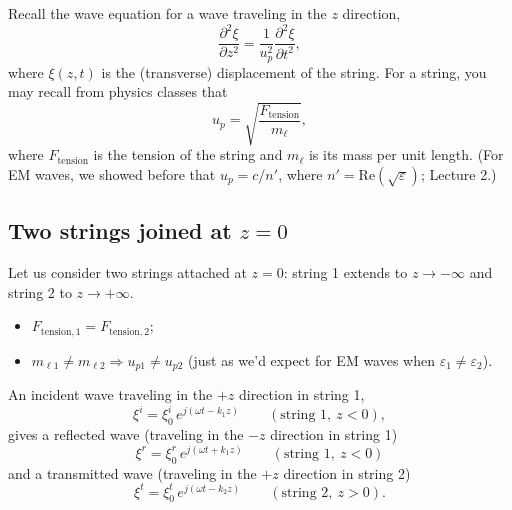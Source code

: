 \documentclass[11pt, oneside]{article}
\begin{document}
Recall the wave equation for a wave traveling in the $z$ direction,
\begin{equation}
	\frac{\partial^2 \xi}{\partial z^2} = \frac{1}{u_p^2}\frac{\partial^2 \xi}{\partial t^2},
\end{equation}
where $\xi(z,t)$ is the (transverse) displacement of the string. For a string, you may recall from physics classes that
\begin{equation}
	u_p = \sqrt{\frac{F_\mathrm{tension}}{m_\ell}},
\end{equation}
where $F_\mathrm{tension}$ is the tension of the string and $m_\ell$ is its mass per unit length. (For EM waves, we showed before that $u_p = c/n'$, where $n' = \mathrm{Re}(\sqrt{\varepsilon})$; Lecture 2.)

\subsection{Two strings joined at $z = 0$}

Let us consider two strings attached at $z = 0$: string 1 extends to $z\to-\infty$ and string 2 to $z\to+\infty$.
\begin{itemize}
	\item $F_{\mathrm{tension},1} = F_{\mathrm{tension},2}$;
	\item $m_{\ell 1} \ne m_{\ell 2} \Rightarrow u_{p1} \ne u_{p2}$ (just as we'd expect for EM waves when $\varepsilon_1 \ne \varepsilon_2$).
\end{itemize}

An incident wave traveling in the $+z$ direction in string 1,
\begin{equation}
	\xi^i = \xi_0^i\,e^{j(\omega t - k_1 z)} \qquad (\text{string 1},\ z<0),
\end{equation}
gives a reflected wave (traveling in the $-z$ direction in string 1)
\begin{equation}
	\xi^r = \xi_0^r\,e^{j(\omega t + k_1 z)} \qquad (\text{string 1},\ z<0)
\end{equation}
and a transmitted wave (traveling in the $+z$ direction in string 2)
\begin{equation}
	\xi^t = \xi_0^t\,e^{j(\omega t - k_2 z)} \qquad (\text{string 2},\ z>0).
\end{equation}
\end{document}
